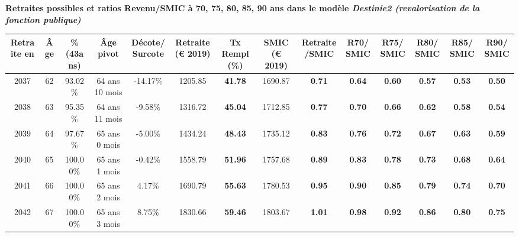  \vspace{0.1cm} 
{\bf \noindent Retraites possibles et ratios Revenu/SMIC à 70, 75, 80, 85, 90 ans dans le modèle \emph{Destinie2 (revalorisation de la fonction publique)}}  
 
\begin{adjustbox}{max width=\textwidth} 
\begin{tabular}[htb]{|c|c||c|c|c||c|c||c|c||c|c|c|c|c|} 
\hline 
 Retraite en &  Âge &  \%(43ans) &  Âge pivot &  Décote/Surcote &  Retraite (\euro{} 2019) &  Tx Rempl(\%) &  SMIC (\euro{} 2019) &  Retraite/SMIC &  R70/SMIC &  R75/SMIC &  R80/SMIC &  R85/SMIC &  R90/SMIC \\ 
\hline \hline 
 2037 &  62 &  93.02\% &  64 ans 10 mois &  -14.17\% &  1205.85 &  {\bf 41.78} &  1690.87 &  {\bf {\color{red} 0.71}} &  {\bf {\color{red} 0.64}} &  {\bf {\color{red} 0.60}} &  {\bf {\color{red} 0.57}} &  {\bf {\color{red} 0.53}} &  {\bf {\color{red} 0.50}} \\ 
\hline 
 2038 &  63 &  95.35\% &  64 ans 11 mois &  -9.58\% &  1316.72 &  {\bf 45.04} &  1712.85 &  {\bf {\color{red} 0.77}} &  {\bf {\color{red} 0.70}} &  {\bf {\color{red} 0.66}} &  {\bf {\color{red} 0.62}} &  {\bf {\color{red} 0.58}} &  {\bf {\color{red} 0.54}} \\ 
\hline 
 2039 &  64 &  97.67\% &  65 ans 0 mois &  -5.00\% &  1434.24 &  {\bf 48.43} &  1735.12 &  {\bf {\color{red} 0.83}} &  {\bf {\color{red} 0.76}} &  {\bf {\color{red} 0.72}} &  {\bf {\color{red} 0.67}} &  {\bf {\color{red} 0.63}} &  {\bf {\color{red} 0.59}} \\ 
\hline 
 2040 &  65 &  100.00\% &  65 ans 1 mois &  -0.42\% &  1558.79 &  {\bf 51.96} &  1757.68 &  {\bf {\color{red} 0.89}} &  {\bf {\color{red} 0.83}} &  {\bf {\color{red} 0.78}} &  {\bf {\color{red} 0.73}} &  {\bf {\color{red} 0.68}} &  {\bf {\color{red} 0.64}} \\ 
\hline 
 2041 &  66 &  100.00\% &  65 ans 2 mois &  4.17\% &  1690.79 &  {\bf 55.63} &  1780.53 &  {\bf {\color{red} 0.95}} &  {\bf {\color{red} 0.90}} &  {\bf {\color{red} 0.85}} &  {\bf {\color{red} 0.79}} &  {\bf {\color{red} 0.74}} &  {\bf {\color{red} 0.70}} \\ 
\hline 
 2042 &  67 &  100.00\% &  65 ans 3 mois &  8.75\% &  1830.66 &  {\bf 59.46} &  1803.67 &  {\bf 1.01} &  {\bf {\color{red} 0.98}} &  {\bf {\color{red} 0.92}} &  {\bf {\color{red} 0.86}} &  {\bf {\color{red} 0.80}} &  {\bf {\color{red} 0.75}} \\ 
\hline 
\hline 
\end{tabular} 
\end{adjustbox} 
 
